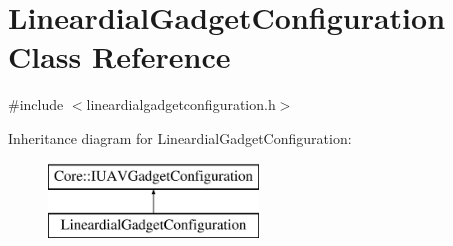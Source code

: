 \hypertarget{class_lineardial_gadget_configuration}{\section{\-Lineardial\-Gadget\-Configuration \-Class \-Reference}
\label{class_lineardial_gadget_configuration}
}


{\ttfamily \#include $<$lineardialgadgetconfiguration.\-h$>$}

\-Inheritance diagram for \-Lineardial\-Gadget\-Configuration\-:\begin{figure}[H]
\begin{center}
\leavevmode
\includegraphics[height=2.000000cm]{class_lineardial_gadget_configuration}
\end{center}
\end{figure}
